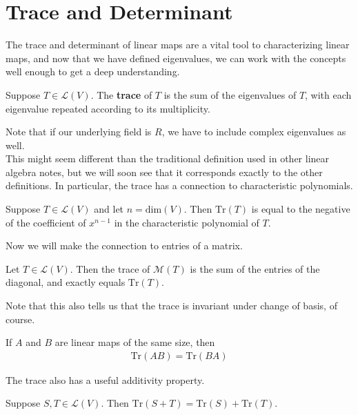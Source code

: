 \documentclass{memoir}
\begin{document}
\section{Trace and Determinant}
\label{sec:trace_and_determinant}

The trace and determinant of linear maps are a vital tool to characterizing linear maps, and now that we have defined eigenvalues, we can work with the concepts well enough to get a deep understanding.

\begin{defn}[Trace]
	Suppose \(T \in \mathcal{L}(V)\). The \textbf{trace} of \(T\) is the sum of the eigenvalues of \(T\), with each eigenvalue repeated according to its multiplicity.
\end{defn}
Note that if our underlying field is \(R\), we have to include complex eigenvalues as well.\\

This might seem different than the traditional definition used in other linear algebra notes, but we will soon see that it corresponds exactly to the other definitions. In particular, the trace has a connection to characteristic polynomials.

\begin{prop}
	Suppose \(T \in \mathcal{L}(V)\) and let \(n = \textrm{dim}(V)\). Then \(\textrm{Tr}(T)\) is equal to the negative of the coefficient of \(x^{n-1}\) in the characteristic polynomial of \(T\).
\end{prop}

Now we will make the connection to entries of a matrix.
\begin{thm}
	Let \(T \in \mathcal{L}(V)\). Then the trace of \(\mathcal{M}(T)\) is the sum of the entries of the diagonal, and exactly equals \(\textrm{Tr}(T)\).
\end{thm}

Note that this also tells us that the trace is invariant under change of basis, of course.

\begin{cor}
	If \(A\) and \(B\) are linear maps of the same size, then
	\begin{align*}
		\textrm{Tr}(AB) = \textrm{Tr}(BA)
	\end{align*}
\end{cor}

The trace also has a useful additivity property.

\begin{prop}
	Suppose \(S,T \in \mathcal{L}(V)\). Then \(\textrm{Tr}(S+T) = \textrm{Tr}(S) + \textrm{Tr}(T)\).
\end{prop}
\end{document}
